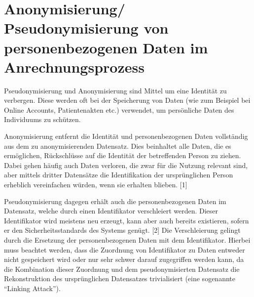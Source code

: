 \chapter{Anonymisierung/ Pseudonymisierung von personenbezogenen Daten im Anrechnungsprozess}

Pseudonymisierung und Anonymisierung sind Mittel um eine Identität zu verbergen. 
Diese werden oft bei der Speicherung von Daten (wie zum Beispiel bei Online Accounts, Patientenakten etc.) verwendet, um persönliche Daten des Individuums zu schützen. 

Anonymisierung entfernt die Identität und personenbezogenen Daten vollständig aus dem zu anonymisierenden Datensatz. Dies beinhaltet alle Daten, die es ermöglichen, Rückschlüsse auf die Identität der betreffenden Person zu ziehen. Dabei gehen häufig auch Daten verloren, die zwar für die Nutzung relevant sind, aber mittels dritter Datensätze die Identifikation der ursprünglichen Person erheblich vereinfachen würden, wenn sie erhalten blieben.  [1]

Pseudonymisierung dagegen erhält auch die personenbezogenen Daten im Datensatz, welche durch einen Identifikator verschleiert werden. Dieser Identifikator wird meistens neu erzeugt, kann aber auch bereits existieren, sofern er den Sicherheitsstandards des Systems genügt. [2]
Die Verschleierung gelingt durch die Ersetzung der personenbezogenen Daten mit dem Identifikator. Hierbei muss beachtet werden, dass die Zuordnung von Identifikator zu Daten entweder nicht gespeichert wird oder nur sehr schwer darauf zugegriffen werden kann, da die Kombination dieser Zuordnung und dem pseudonymisierten Datensatz die Rekonstruktion des ursprünglichen Datensatzes trivialisiert (eine sogenannte “Linking Attack”).

